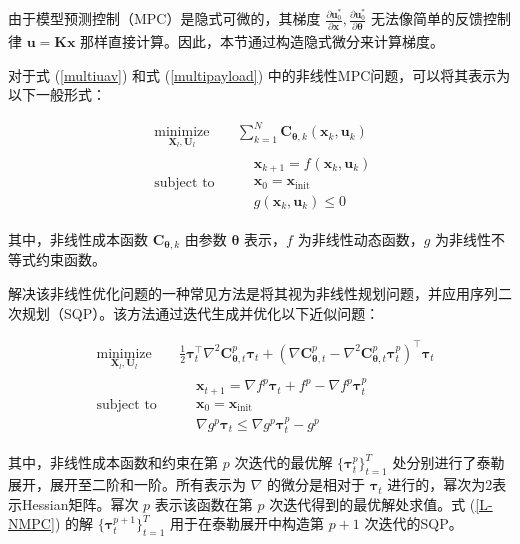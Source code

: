 \documentclass[lang=chs, degree=master, blindreview=true, winfonts=true]{yanputhesis}
\begin{document}
由于模型预测控制（MPC）是隐式可微的，其梯度 \( \frac{\partial \bm u_{0}^*}{\partial \bm x_{}}, \frac{\partial \bm u_{0}^*}{\partial \bm \theta_{}} \) 无法像简单的反馈控制律 \( \bm u = \bm K \bm x \) 那样直接计算。因此，本节通过构造隐式微分来计算梯度。

对于式 (\ref{multiuav}) 和式 (\ref{multipayload}) 中的非线性MPC问题，可以将其表示为以下一般形式：

\begin{equation}
\begin{aligned} 
&\operatorname*{minimize}_{\bm{X}_l, \bm{U}_l} & &  \sum_{k=1}^N{\bm C}_{\bm \theta,k}(\bm x_k,\bm u_k) \\
&\text{subject to} & & \begin{aligned}
& \bm{x}_{k+1} ={f}_{}(\bm{x}_{k}, \bm{u}_{k}) \\
& \bm{x}_{0} = \bm{x}_\text{init}\\
& g(\bm x_k,\bm u_k) \leqslant 0	
\end{aligned}	
\end{aligned}
\label{NMPC}
\end{equation}

其中，非线性成本函数 \( \bm C_{\bm \theta,k} \) 由参数 \( \bm \theta \) 表示，\( f \) 为非线性动态函数，\( g \) 为非线性不等式约束函数。

解决该非线性优化问题的一种常见方法是将其视为非线性规划问题，并应用序列二次规划（SQP）。该方法通过迭代生成并优化以下近似问题：

\begin{equation}
\begin{aligned} 
&\operatorname*{minimize}_{\bm{X}_l, \bm{U}_l} & & \frac{1}{2}\bm{\tau}_{t}^{\top}\nabla^{2}\bm C_{\bm \theta,t}^{p}\bm{\tau}_{t}+(\nabla \bm C_{\bm \theta,t}^{p}-\nabla^{2}\bm C_{\bm \theta,t}^{p}\bm{\tau}_{t}^{p})^{\top}\bm{\tau}_{t} \\
&\text{subject to} & & \begin{aligned}
& \bm{x}_{t+1}=\nabla f^{p}\bm{\tau}_{t}+f^{p}-\nabla f^{p}\bm{\tau}_{t}^{p} \\
& \bm{x}_{0} = \bm{x}_\text{init} \\
& \nabla g^{p}\bm{\tau}_{t}\leq\nabla g^{p}\bm{\tau}_{t}^{p}-g^{p}	
\end{aligned}
\end{aligned}	
\label{L-NMPC}
\end{equation}

其中，非线性成本函数和约束在第 \(p\) 次迭代的最优解 \( \{\bm  \tau_t^p \}_{t=1}^{T} \) 处分别进行了泰勒展开，展开至二阶和一阶。所有表示为 \( \nabla \) 的微分是相对于 \( \bm \tau_t \) 进行的，幂次为2表示Hessian矩阵。幂次 \( p \) 表示该函数在第 \( p \) 次迭代得到的最优解处求值。式 (\ref{L-NMPC}) 的解 \( \{\bm \tau_t^{p+1} \}_{t=1}^{T} \) 用于在泰勒展开中构造第 \( p+1 \) 次迭代的SQP。
\end{document}
